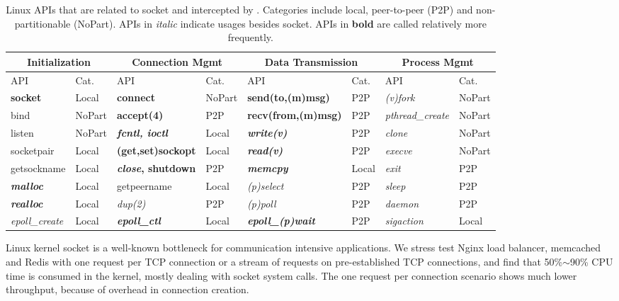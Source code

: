 \begin{table*}[t!]
	\centering
	\begin{tabular}{ll|ll|ll|ll}
		\hline
		\multicolumn{2}{c|}{Initialization} &
		\multicolumn{2}{c|}{Connection Mgmt} &
		\multicolumn{2}{c|}{Data Transmission} &
		\multicolumn{2}{c}{Process Mgmt} \\
		\hline
		API & Cat. &
		API & Cat. &
		API & Cat. &
		API & Cat. \\
		\hline
		\hline
		\textbf{socket} & Local &
		\textbf{connect} & NoPart &
		\textbf{send(to,(m)msg)} & P2P &
		\textit{(v)fork} & NoPart \\
		\hline
		bind & NoPart &
		\textbf{accept(4)} & P2P &
		\textbf{recv(from,(m)msg)} & P2P &
		\textit{pthread\_create} & NoPart \\
		\hline
		listen & NoPart &
		\textbf{\textit{fcntl, ioctl}} & Local &
		\textbf{\textit{write(v)}} & P2P &
		\textit{clone} & NoPart \\
		\hline
		socketpair & Local &
		\textbf{(get,set)sockopt} & Local &
		\textbf{\textit{read(v)}} & P2P &
		\textit{execve} & NoPart \\
		\hline
		getsockname  & Local &
		\textbf{\textit{close}, shutdown} & P2P &
		\textbf{\textit{memcpy}} & Local &
		\textit{exit} & P2P \\
		\hline
		\textbf{\textit{malloc}} & Local &
		getpeername & Local &
		\textit{(p)select} & P2P &
		\textit{sleep} & P2P \\
		\hline
		\textbf{\textit{realloc}} & Local &
		\textit{dup(2)} & P2P &
		\textit{(p)poll} & P2P &
		\textit{daemon} & P2P \\
		\hline
		\textit{epoll\_create} & Local &
		\textbf{\textit{epoll\_ctl}} & Local &
		\textbf{\textit{epoll\_(p)wait}} & P2P &
		\textit{sigaction} & Local \\
		\hline
	\end{tabular}
	\caption{Linux APIs that are related to socket and intercepted by \libipc{}. Categories include local, peer-to-peer (P2P) and non-partitionable (NoPart). APIs in \textit{italic} indicate usages besides socket. APIs in \textbf{bold} are called relatively more frequently.}
	\vspace{-10pt}
	\label{tab:socket-api}
\end{table*}



Linux kernel socket is a well-known bottleneck for communication intensive applications. We stress test Nginx load balancer, memcached and Redis with one request per TCP connection or a stream of requests on pre-established TCP connections, and find that 50\%$\sim$90\% CPU time is consumed in the kernel, mostly dealing with socket system calls. The one request per connection scenario shows much lower throughput, because of overhead in connection creation.

